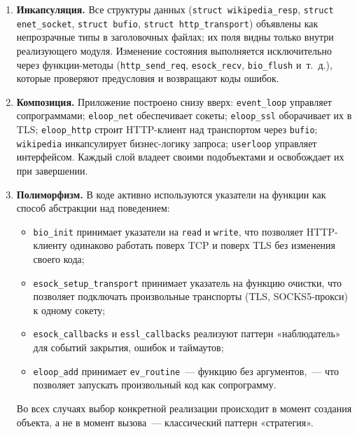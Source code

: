 \documentclass[12pt]{extarticle}
\begin{document}
\begin{enumerate}
    \item \textbf{Инкапсуляция.} Все структуры данных
          (\texttt{struct wikipedia\_resp}, \texttt{struct
          enet\_socket}, \texttt{struct bufio},
          \texttt{struct http\_transport}) объявлены как
          непрозрачные типы в заголовочных файлах; их поля
          видны только внутри реализующего модуля. Изменение
          состояния выполняется исключительно через
          функции-методы (\texttt{http\_send\_req},
          \texttt{esock\_recv}, \texttt{bio\_flush} и~т.~д.),
          которые проверяют предусловия и возвращают
          коды ошибок.

    \item \textbf{Композиция.} Приложение построено снизу
          вверх: \texttt{event\_loop} управляет сопрограммами;
          \texttt{eloop\_net} обеспечивает сокеты;
          \texttt{eloop\_ssl} оборачивает их в TLS;
          \texttt{eloop\_http} строит HTTP-клиент над
          транспортом через \texttt{bufio}; \texttt{wikipedia}
          инкапсулирует бизнес-логику запроса;
          \texttt{userloop} управляет интерфейсом. Каждый
          слой владеет своими подобъектами и освобождает их
          при завершении.

    \item \textbf{Полиморфизм.} В коде активно используются
          указатели на функции как способ абстракции над
          поведением:
          \begin{itemize}
              \item \texttt{bio\_init} принимает указатели на
                    \texttt{read} и \texttt{write}, что
                    позволяет HTTP-клиенту одинаково работать
                    поверх TCP и поверх TLS без изменения
                    своего кода;
              \item \texttt{esock\_setup\_transport} принимает
                    указатель на функцию очистки, что позволяет
                    подключать произвольные транспорты (TLS,
                    SOCKS5-прокси) к одному сокету;
              \item \texttt{esock\_callbacks} и
                    \texttt{essl\_callbacks} реализуют паттерн
                    «наблюдатель» для событий закрытия,
                    ошибок и таймаутов;
              \item \texttt{eloop\_add} принимает
                    \texttt{ev\_routine}~--- функцию без
                    аргументов,~--- что позволяет запускать
                    произвольный код как сопрограмму.
          \end{itemize}
          Во всех случаях выбор конкретной реализации
          происходит в момент создания объекта, а не в момент
          вызова~--- классический паттерн «стратегия».


\end{enumerate}
\end{document}
